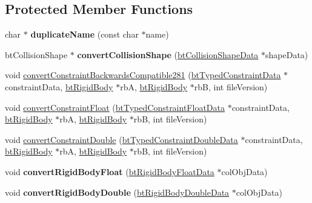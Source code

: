 \subsection*{Protected Member Functions}
\begin{DoxyCompactItemize}
\item 
\hypertarget{classbt_world_importer_a01b92ef86d898fddcf65235c278d1736}{char $\ast$ {\bfseries duplicate\+Name} (const char $\ast$name)}\label{classbt_world_importer_a01b92ef86d898fddcf65235c278d1736}

\item 
\hypertarget{classbt_world_importer_ab404aa295cf66a776e297614f4f822e7}{bt\+Collision\+Shape $\ast$ {\bfseries convert\+Collision\+Shape} (\hyperlink{structbt_collision_shape_data}{bt\+Collision\+Shape\+Data} $\ast$shape\+Data)}\label{classbt_world_importer_ab404aa295cf66a776e297614f4f822e7}

\item 
void \hyperlink{classbt_world_importer_a1e217f125f6094afd27e0d56ba1f26a0}{convert\+Constraint\+Backwards\+Compatible281} (\hyperlink{structbt_typed_constraint_data}{bt\+Typed\+Constraint\+Data} $\ast$constraint\+Data, \hyperlink{classbt_rigid_body}{bt\+Rigid\+Body} $\ast$rb\+A, \hyperlink{classbt_rigid_body}{bt\+Rigid\+Body} $\ast$rb\+B, int file\+Version)
\item 
void \hyperlink{classbt_world_importer_a852402389daff8195a23ebeff7167fc2}{convert\+Constraint\+Float} (\hyperlink{structbt_typed_constraint_float_data}{bt\+Typed\+Constraint\+Float\+Data} $\ast$constraint\+Data, \hyperlink{classbt_rigid_body}{bt\+Rigid\+Body} $\ast$rb\+A, \hyperlink{classbt_rigid_body}{bt\+Rigid\+Body} $\ast$rb\+B, int file\+Version)
\item 
void \hyperlink{classbt_world_importer_a5100315904d183d8dc0d0e6406f17fcb}{convert\+Constraint\+Double} (\hyperlink{structbt_typed_constraint_double_data}{bt\+Typed\+Constraint\+Double\+Data} $\ast$constraint\+Data, \hyperlink{classbt_rigid_body}{bt\+Rigid\+Body} $\ast$rb\+A, \hyperlink{classbt_rigid_body}{bt\+Rigid\+Body} $\ast$rb\+B, int file\+Version)
\item 
\hypertarget{classbt_world_importer_ae3463a7637ad21ff921a073e15ccce1d}{void {\bfseries convert\+Rigid\+Body\+Float} (\hyperlink{structbt_rigid_body_float_data}{bt\+Rigid\+Body\+Float\+Data} $\ast$col\+Obj\+Data)}\label{classbt_world_importer_ae3463a7637ad21ff921a073e15ccce1d}

\item 
\hypertarget{classbt_world_importer_ac8d3bdda4d8be8085ce72d9462fff559}{void {\bfseries convert\+Rigid\+Body\+Double} (\hyperlink{structbt_rigid_body_double_data}{bt\+Rigid\+Body\+Double\+Data} $\ast$col\+Obj\+Data)}\label{classbt_world_importer_ac8d3bdda4d8be8085ce72d9462fff559}

\end{DoxyCompactItemize}
